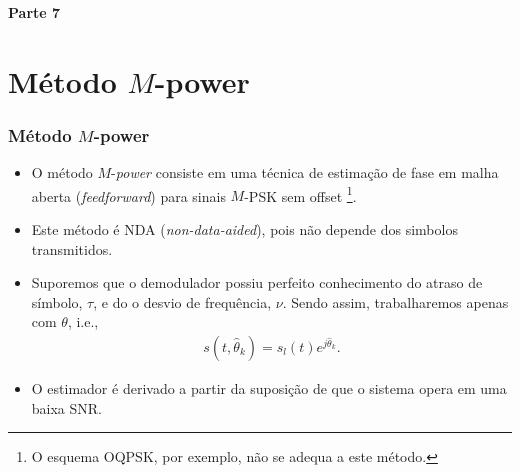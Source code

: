 
\begin{frame}
	\begin{block}{\centering\large\bfseries Parte 7}
		\centering\large\insertpart
	\end{block}
\end{frame}

\section{Método \(M\)-power}
\begin{frame}[t]
	\frametitle{Método \(M\)-power}
	
	\begin{itemize}
        \item O método \(M\)-\textit{power} consiste em uma técnica de estimação de fase em malha aberta (\textit{feedforward}) para sinais \(M\)-PSK sem offset \footnote{O esquema OQPSK, por exemplo, não se adequa a este método.}.
        \item Este método é NDA (\textit{non-data-aided}), pois não depende dos simbolos transmitidos.
        \item Suporemos que o demodulador possiu perfeito conhecimento do atraso de símbolo, \(\tau\), e do o desvio de frequência, \(\nu\). Sendo assim, trabalharemos apenas com \(\theta\), i.e.,
        \begin{align}
            s(t, \hat{\theta}_{k}) = s_l (t) e^{j\hat{\theta}_{k}}.
            \label{eq:s_t}
        \end{align}
        \item O estimador é derivado a partir da suposição de que o sistema opera em uma baixa SNR.
    \end{itemize}
\end{frame}

